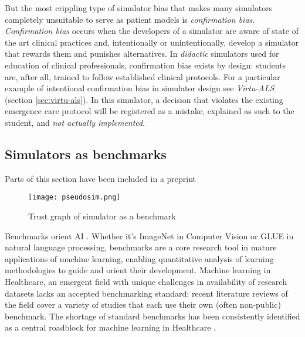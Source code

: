 But the most crippling type of simulator bias that makes many simulators completely unsuitable to serve as patient models is \emph{confirmation bias}.
\emph{Confirmation bias} occurs when the developers of a simulator are aware of state of the art clinical practices and, intentionally or unintentionally, develop a simulator that rewards them and punishes alternatives.
In \emph{didactic} simulators used for education of clinical professionals, confirmation bias exists by design: students are, after all, trained to follow established clinical protocols.
For a particular example of intentional confirmation bias in simulator design see \emph{Virtu-ALS} (section \ref{sec:virtu-als}).
In this simulator, a decision that violates the existing emergence care protocol will be registered as a mistake, explained as such to the student, and \emph{not actually implemented}.

\subsection{Simulators as benchmarks}
\label{sec:simulators-as-benchmarks}

\begin{remark}
    Parts of this section have been included in a preprint \cite{liventsevPhilHumansBenchmarkingMachine2024}
\end{remark}

\begin{figure}
    \centering
    \texttt{[image: pseudosim.png]}
    \caption{Trust graph of simulator as a benchmark}
    \label{fig:benchmark}
\end{figure}

Benchmarks orient AI \cite{liangHolisticEvaluationLanguage2022}. Whether it's ImageNet \cite{dengImagenetLargescaleHierarchical2009} in Computer Vision or GLUE \cite{wangGLUEMultitaskBenchmark2018} in natural language processing, benchmarks are a core research tool in mature applications of machine learning, enabling quantitative analysis of learning methodologies to guide and orient their development.
Machine learning in Healthcare, an emergent field with unique challenges in availability of research datasets \cite{Anshik2021Handling,Gilbert2015market,Pahwa2021Big,Yazhini2019State} lacks an accepted benchmarking standard: recent literature reviews \cite{palMachineLearningHealthcare2023,tortorellaHealthcareTrendsChallenges2020} of the field cover a variety of studies that each use their own (often non-public) benchmark. The shortage of standard benchmarks has been consistently identified as a central roadblock for machine learning in Healthcare
\cite{Crown2015Potential,David2020Evaluating,guSupervisedLearningPervasive2023,harutyunyanMultitaskLearningBenchmarking2019,Kathrin2022Benchmark,mcdermottReproducibilityMachineLearning2021,purushothamBenchmarkingDeepLearning2018,S2017Benchmark}.

